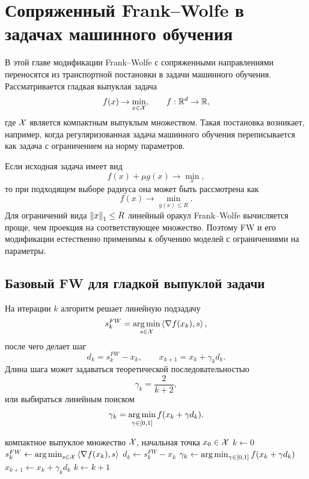 \newpage

\section{Сопряженный Frank--Wolfe в задачах машинного обучения}
\label{sec:cfw-ml}

В этой главе модификации Frank--Wolfe с сопряженными направлениями переносятся из транспортной постановки в задачи машинного обучения.
Рассматривается гладкая выпуклая задача
\begin{equation}
    f(x)\to\min_{x\in\mathcal{X}},
    \qquad
    f:\mathbb{R}^d\to\mathbb{R},
    \label{eq:ml-constrained-problem}
\end{equation}
где $\mathcal{X}$ является компактным выпуклым множеством.
Такая постановка возникает, например, когда регуляризованная задача машинного обучения переписывается как задача с ограничением на норму параметров.

Если исходная задача имеет вид
\[
    f(x)+\mu g(x)\to\min_x,
\]
то при подходящем выборе радиуса она может быть рассмотрена как
\[
    f(x)\to\min_{g(x)\leq R}.
\]
Для ограничений вида $\left\|x\right\|_1\leq R$ линейный оракул Frank--Wolfe вычисляется проще, чем проекция на соответствующее множество.
Поэтому FW и его модификации естественно применимы к обучению моделей с ограничениями на параметры.

\subsection{Базовый FW для гладкой выпуклой задачи}

На итерации $k$ алгоритм решает линейную подзадачу
\begin{equation}
    s_k^{FW}
    =
    \operatorname*{arg\,min}_{s\in\mathcal{X}}
    \left\langle \nabla f(x_k), s \right\rangle,
    \label{eq:ml-fw-lmo}
\end{equation}
после чего делает шаг
\[
    d_k=s_k^{FW}-x_k,
    \qquad
    x_{k+1}=x_k+\gamma_kd_k.
\]
Длина шага может задаваться теоретической последовательностью
\[
    \gamma_k=\frac{2}{k+2},
\]
или выбираться линейным поиском
\[
    \gamma_k=
    \operatorname*{arg\,min}_{\gamma\in[0,1]}
    f(x_k+\gamma d_k).
\]

\begin{algorithm}
\caption{Frank--Wolfe для задачи машинного обучения}
\begin{algorithmic}
\REQUIRE компактное выпуклое множество $\mathcal{X}$, начальная точка $x_0\in\mathcal{X}$
\STATE $k\gets 0$
\REPEAT
\STATE $s_k^{FW}\gets\operatorname*{arg\,min}_{s\in\mathcal{X}}\left\langle \nabla f(x_k), s \right\rangle$
\STATE $d_k\gets s_k^{FW}-x_k$
\STATE $\gamma_k\gets\operatorname*{arg\,min}_{\gamma\in[0,1]}f(x_k+\gamma d_k)$
\STATE $x_{k+1}\gets x_k+\gamma_kd_k$
\STATE $k\gets k+1$
\end{algorithmic}
\end{algorithm}

